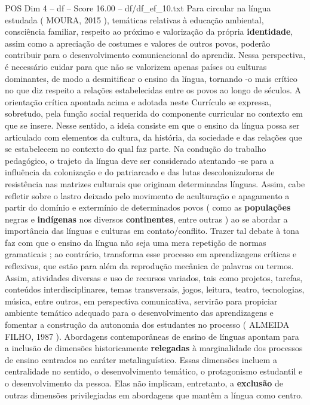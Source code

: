 \begin{textsample}{POS Dim 4 – df – Score 16.00 – df/df\_ef\_10.txt}
Para circular na língua estudada ( MOURA, 2015 ), temáticas relativas à educação ambiental, consciência familiar, respeito ao próximo e valorização da própria \textbf{identidade}, assim como a apreciação de costumes e valores de outros povos, poderão contribuir para o desenvolvimento comunicacional do aprendiz.
Nessa perspectiva, é necessário cuidar para que não se valorizem apenas países ou culturas dominantes, de modo a desmitificar o ensino da língua, tornando -o mais crítico no que diz respeito a relações estabelecidas entre os povos ao longo de séculos.
A orientação crítica apontada acima e adotada neste Currículo se expressa, sobretudo, pela função social requerida do componente curricular no contexto em que se insere.
Nesse sentido, a ideia consiste em que o ensino da língua possa ser articulado com elementos da cultura, da história, da sociedade e das relações que se estabelecem no contexto do qual faz parte.
Na condução do trabalho pedagógico, o trajeto da língua deve ser considerado atentando -se para a influência da colonização e do patriarcado e das lutas descolonizadoras de resistência nas matrizes culturais que originam determinadas línguas.
Assim, cabe refletir sobre o lastro deixado pelo movimento de aculturação e apagamento a partir do domínio e extermínio de determinados povos ( como as \textbf{populações} negras e \textbf{indígenas} nos diversos \textbf{continentes}, entre outras ) ao se abordar a importância das línguas e culturas em contato/conflito.
Trazer tal debate à tona faz com que o ensino da língua não seja uma mera repetição de normas gramaticais ; ao contrário, transforma esse processo em aprendizagens críticas e reflexivas, que estão para além da reprodução mecânica de palavras ou termos.
Assim, atividades diversas e uso de recursos variados, tais como projetos, tarefas, conteúdos interdisciplinares, temas transversais, jogos, leitura, teatro, tecnologias, música, entre outros, em perspectiva comunicativa, servirão para propiciar ambiente temático adequado para o desenvolvimento das aprendizagens e fomentar a construção da autonomia dos estudantes no processo ( ALMEIDA FILHO, 1987 ).
Abordagens contemporâneas de ensino de línguas apontam para a inclusão de dimensões historicamente \textbf{relegadas} à marginalidade dos processos de ensino centrados no caráter metalinguístico.
Essas dimensões incluem a centralidade no sentido, o desenvolvimento temático, o protagonismo estudantil e o desenvolvimento da pessoa.
Elas não implicam, entretanto, a \textbf{exclusão} de outras dimensões privilegiadas em abordagens que mantêm a língua como centro.

\end{textsample}
